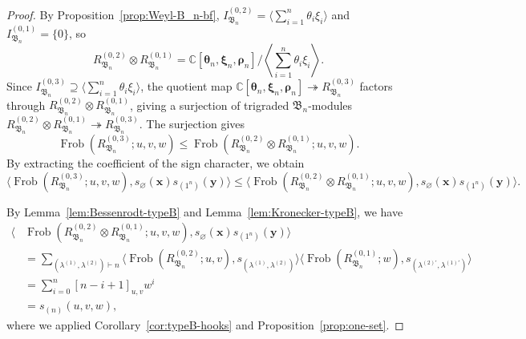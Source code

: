 \documentclass[12pt]{amsart}
\theoremstyle{plain}
\theoremstyle{definition}
\DeclareMathOperator{\Frob}{Frob}
\newcommand{\C}{\mathbb{C}}
\newcommand{\x}{\mathbf{x}}
\newcommand{\y}{\mathbf{y}}
\begin{document}
\begin{proof}
By Proposition~\ref{prop:Weyl-B_n-bf}, $I_{\mathfrak{B}_n}^{(0,2)} = \langle \sum_{i=1}^n \theta_i\xi_i \rangle$ and $I_{\mathfrak{B}_n}^{(0,1)} = \{0\}$, so 
\begin{equation}
    R_{\mathfrak{B}_n}^{(0,2)} \otimes R_{\mathfrak{B}_n}^{(0,1)} = \C[\bm{\theta}_n,\bm{\xi}_n,\bm{\rho}_n]/\left\langle \sum_{i=1}^n \theta_i\xi_i\right\rangle.
\end{equation}
Since $I_{\mathfrak{B}_n}^{(0,3)} \supseteq \langle \sum_{i=1}^n \theta_i\xi_i\rangle$, the quotient map $\C[\bm{\theta}_n,\bm{\xi}_n,\bm{\rho}_n] \twoheadrightarrow R_{\mathfrak{B}_n}^{(0,3)}$ factors through $R_{\mathfrak{B}_n}^{(0,2)} \otimes R_{\mathfrak{B}_n}^{(0,1)}$, giving a surjection of trigraded $\mathfrak{B}_n$-modules $R_{\mathfrak{B}_n}^{(0,2)} \otimes R_{\mathfrak{B}_n}^{(0,1)} \twoheadrightarrow R_{\mathfrak{B}_n}^{(0,3)}$.
The surjection gives
\begin{equation}
    \Frob(R_{\mathfrak{B}_n}^{(0,3)}; u,v,w) \leq \Frob(R_{\mathfrak{B}_n}^{(0,2)} \otimes R_{\mathfrak{B}_n}^{(0,1)}; u,v,w).
\end{equation}
By extracting the coefficient of the sign character, we obtain
\begin{equation}
    \langle \Frob(R_{\mathfrak{B}_n}^{(0,3)}; u,v,w), s_{\varnothing}(\x) s_{(1^n)}(\y) \rangle \leq \langle \Frob(R_{\mathfrak{B}_n}^{(0,2)} \otimes R_{\mathfrak{B}_n}^{(0,1)}; u,v,w), s_{\varnothing}(\x) s_{(1^n)}(\y)\rangle.
\end{equation}

By Lemma~\ref{lem:Bessenrodt-typeB} and Lemma~\ref{lem:Kronecker-typeB}, we have
\begin{equation}\begin{aligned}
    \langle &\Frob(R_{\mathfrak{B}_n}^{(0,2)} \otimes R_{\mathfrak{B}_n}^{(0,1)}; u,v,w), s_{\varnothing}(\x) s_{(1^n)}(\y)\rangle\\ 
    &= \sum_{(\lambda^{(1)},\lambda^{(2)}) \vdash n} \langle \Frob(R_{\mathfrak{B}_n}^{(0,2)}; u,v), s_{(\lambda^{(1)},\lambda^{(2)})} \rangle \langle \Frob(R_{\mathfrak{B}_n}^{(0,1)}; w), s_{(\lambda^{(2)'},\lambda^{(1)'})} \rangle\\
    &= \sum_{i=0}^n [n-i+1]_{u,v}w^i\\
    &= s_{(n)}(u,v,w),
\end{aligned}\end{equation}
where we applied Corollary~\ref{cor:typeB-hooks} and Proposition~\ref{prop:one-set}.
\end{proof}
\end{document}
